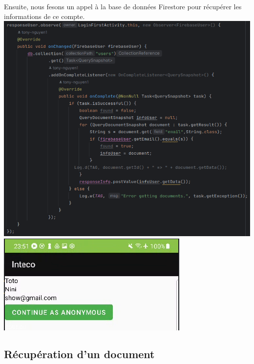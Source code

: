 \documentclass[a4paper]{article}
\begin{document}
\begin{multicols}{2}
        Ensuite, nous fesons un appel à la base de données Firestore pour récupérer les informations de ce compte.
        \noindent\includegraphics[width=.49\textwidth]{codeSignInB}
        \noindent\includegraphics[width=.49\textwidth]{connected}
        \subsection{Récupération d'un document}

\end{multicols}
\end{document}
